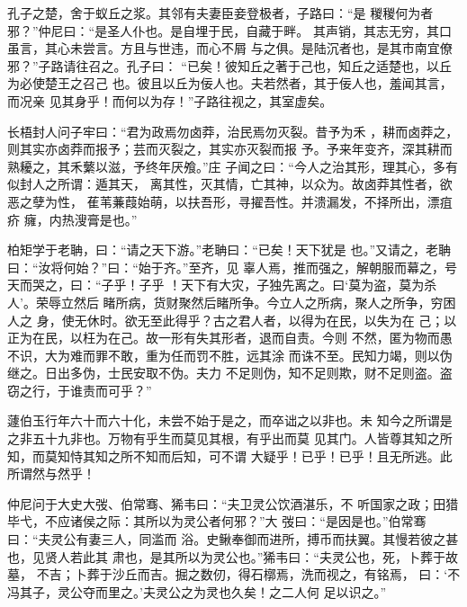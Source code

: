 \documentclass[12pt,UTF8]{ctexbook}
\begin{document}
孔子之楚，舍于蚁丘之浆。其邻有夫妻臣妾登极者，子路曰：“是 稯稯何为者邪？”仲尼曰：“是圣人仆也。是自埋于民，自藏于畔。 其声销，其志无穷，其口虽言，其心未尝言。方且与世违，而心不屑 与之俱。是陆沉者也，是其市南宜僚邪？”子路请往召之。孔子曰： “已矣！彼知丘之著于己也，知丘之适楚也，以丘为必使楚王之召己 也。彼且以丘为佞人也。夫若然者，其于佞人也，羞闻其言，而况亲 见其身乎！而何以为存！”子路往视之，其室虚矣。

长梧封人问子牢曰：“君为政焉勿卤莽，治民焉勿灭裂。昔予为禾 ，耕而卤莽之，则其实亦卤莽而报予；芸而灭裂之，其实亦灭裂而报 予。予来年变齐，深其耕而熟耰之，其禾蘩以滋，予终年厌飧。”庄 子闻之曰：“今人之治其形，理其心，多有似封人之所谓：遁其天， 离其性，灭其情，亡其神，以众为。故卤莽其性者，欲恶之孽为性， 萑苇蒹葭始萌，以扶吾形，寻擢吾性。并溃漏发，不择所出，漂疽疥 癕，内热溲膏是也。”

柏矩学于老聃，曰：“请之天下游。”老聃曰：“已矣！天下犹是 也。”又请之，老聃曰：“汝将何始？”曰：“始于齐。”至齐，见 辜人焉，推而强之，解朝服而幕之，号天而哭之，曰：“子乎！子乎 ！天下有大灾，子独先离之。曰‘莫为盗，莫为杀人’。荣辱立然后 睹所病，货财聚然后睹所争。今立人之所病，聚人之所争，穷困人之 身，使无休时。欲无至此得乎？古之君人者，以得为在民，以失为在 己；以正为在民，以枉为在己。故一形有失其形者，退而自责。今则 不然，匿为物而愚不识，大为难而罪不敢，重为任而罚不胜，远其涂 而诛不至。民知力竭，则以伪继之。日出多伪，士民安取不伪。夫力 不足则伪，知不足则欺，财不足则盗。盗窃之行，于谁责而可乎？”

蘧伯玉行年六十而六十化，未尝不始于是之，而卒诎之以非也。未 知今之所谓是之非五十九非也。万物有乎生而莫见其根，有乎出而莫 见其门。人皆尊其知之所知，而莫知恃其知之所不知而后知，可不谓 大疑乎！已乎！已乎！且无所逃。此所谓然与然乎！

仲尼问于大史大弢、伯常骞、狶韦曰：“夫卫灵公饮酒湛乐，不 听国家之政；田猎毕弋，不应诸侯之际：其所以为灵公者何邪？”大 弢曰：“是因是也。”伯常骞曰：“夫灵公有妻三人，同滥而 浴。史鳅奉御而进所，搏币而扶翼。其慢若彼之甚也，见贤人若此其 肃也，是其所以为灵公也。”狶韦曰：“夫灵公也，死，卜葬于故墓， 不吉；卜葬于沙丘而吉。掘之数仞，得石槨焉，洗而视之，有铭焉， 曰：‘不冯其子，灵公夺而里之。’夫灵公之为灵也久矣！之二人何 足以识之。”
\end{document}
